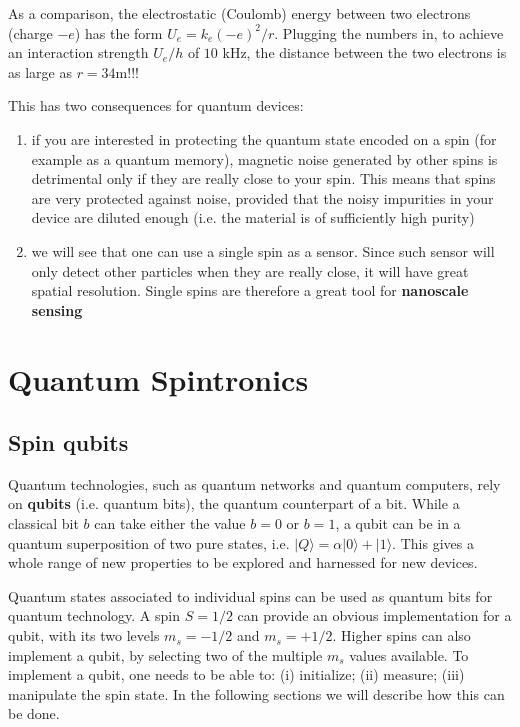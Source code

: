\documentclass[a4paper,11pt]{article}
\newcommand{\ket}[1]{| #1 \rangle}
\begin{document}
As a comparison, the electrostatic (Coulomb) energy between two electrons (charge $-e$) has the form $U_e = k_e (-e)^2/r$. Plugging the numbers in, to achieve an interaction strength $U_e/h$ of $10$ kHz, the distance between the two electrons is as large as $r = 34$m!!!

This has two consequences for quantum devices:
\begin{enumerate}
    \item if you are interested in protecting the quantum state encoded on a spin (for example as a quantum memory), magnetic noise generated by other spins is detrimental only if they are really close to your spin. This means that spins are very protected against noise, provided that the noisy impurities in your device are diluted enough (i.e. the material is of sufficiently high purity)
    \item we will see that one can use a single spin as a sensor. Since such sensor will only detect other particles when they are really close, it will have great spatial resolution. Single spins are therefore a great tool for {\bf nanoscale sensing}
\end{enumerate}


\section {Quantum Spintronics}

\subsection {Spin qubits}
Quantum technologies, such as quantum networks and quantum computers, rely on {\bf qubits} (i.e. quantum bits), the quantum counterpart of a bit. While a classical bit $b$ can take either the value $b=0$ or $b=1$, a qubit can be in a quantum superposition of two pure states, i.e. $\ket{Q} = \alpha \ket{0} + \ket{1}$. This gives a whole range of new properties to be explored and harnessed for new devices. 

Quantum states associated to individual spins can be used as quantum bits for quantum technology. A spin $S=1/2$ can provide an obvious implementation for a qubit, with its two levels $m_s=-1/2$ and $m_s = +1/2$. Higher spins can also implement a qubit, by selecting two of the multiple $m_s$ values available. To implement a qubit, one needs to be able to: (i) initialize; (ii) measure; (iii) manipulate the spin state. In the following sections we will describe how this can be done.
\end{document}
